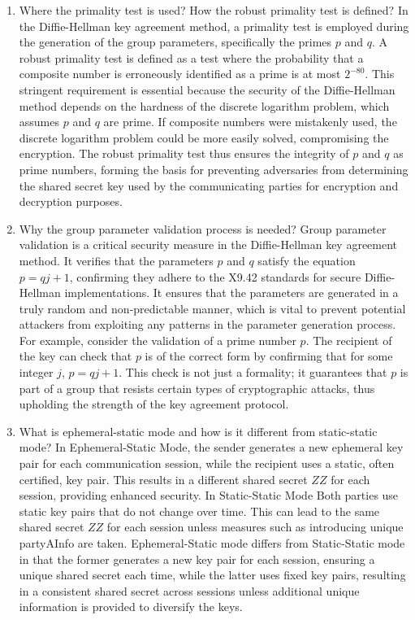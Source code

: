 \documentclass{article}
\begin{document}
\begin{enumerate}
    \item Where the primality test is used? How the robust primality test is defined?
    In the Diffie-Hellman key agreement method, a primality test is employed during the generation of the group parameters, specifically the primes \( p \) and \( q \).
    A robust primality test is defined as a test where the probability that a composite number is erroneously identified as a prime is at most \( 2^{-80} \).
    This stringent requirement is essential because the security of the Diffie-Hellman method depends on the hardness of the discrete logarithm problem, which assumes \( p \) and \( q \) are prime.
    If composite numbers were mistakenly used, the discrete logarithm problem could be more easily solved, compromising the encryption.
    The robust primality test thus ensures the integrity of \( p \) and \( q \) as prime numbers, forming the basis for preventing adversaries from determining the shared secret key used by the communicating parties for encryption and decryption purposes.

    \item Why the group parameter validation process is needed?
    Group parameter validation is a critical security measure in the Diffie-Hellman key agreement method.
    It verifies that the parameters \( p \) and \( q \) satisfy the equation \( p = qj + 1 \), confirming they adhere to the X9.42 standards for secure Diffie-Hellman implementations.
    It ensures that the parameters are generated in a truly random and non-predictable manner, which is vital to prevent potential attackers from exploiting any patterns in the parameter generation process.
    For example, consider the validation of a prime number \( p \).
    The recipient of the key can check that \( p \) is of the correct form by confirming that for some integer \( j \), \( p = qj + 1 \).
    This check is not just a formality; it guarantees that \( p \) is part of a group that resists certain types of cryptographic attacks, thus upholding the strength of the key agreement protocol.

    \item What is ephemeral-static mode and how is it different from static-static mode?
    In Ephemeral-Static Mode, the sender generates a new ephemeral key pair for each communication session, while the recipient uses a static, often certified, key pair.
    This results in a different shared secret \( ZZ \) for each session, providing enhanced security.
    In Static-Static Mode Both parties use static key pairs that do not change over time.
    This can lead to the same shared secret \( ZZ \) for each session unless measures such as introducing unique partyAInfo are taken.
    Ephemeral-Static mode differs from Static-Static mode in that the former generates a new key pair for each session, ensuring a unique shared secret each time, while the latter uses fixed key pairs, resulting in a consistent shared secret across sessions unless additional unique information is provided to diversify the keys.

\end{enumerate}
\end{document}
